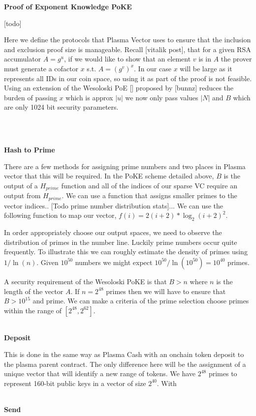 \documentclass[11pt]{article}
\begin{document}
\centerline{\textbf{Proof of Exponent Knowledge \textbf{PoKE}}}

[todo]

Here we define the protocols that Plasma Vector uses to ensure that the inclusion and exclusion proof size is manageable. Recall [vitalik post], that for a given RSA accumulator $A = g^u$, if we would like to show that an element $v$ is in $A$ the prover must generate a cofactor $x$ s.t. $A = (g^v)^x$. In our case $x$ will be large as it represents all IDs in our coin space, so using it as part of the proof is not feasible. Using an extension of the Wesoloski PoE [] proposed by [bunnz] reduces the burden of passing $x$ which is approx $|u|$ we now only pass values $|N|$ and $B$ which are only 1024 bit security parameters.



\\ 
\\
\centerline{\textbf{Hash to Prime}}

There are a few methods for assigning prime numbers and two places in Plasma vector that this will be required. In the PoKE scheme detailed above, $B$ is the output of a $H_{prime}$ function and all of the indices of our sparse VC require an output from $H_{prime}$. We can use a function that assigns smaller primes to the vector indices.. [Todo prime number distribution stats]... We can use the following function to map our vector, $f(i)=2(i+2)* \log_2(i+2)^2$.

In order appropriately choose our output spaces, we need to observe the distribution of primes in the number line. Luckily prime numbers occur quite frequently. To illustrate this we can roughly estimate the density of primes using $1/\ln(n)$. Given $10^{50}$ numbers we might expect $10^{50}/\ln(10^{50})=10^{40} $ primes.

A security requirement of the Wesoloski PoKE is that $B > n$ where $n$ is the length of the vector $A$. If $n=2^{48}$ primes then we will have to ensure that $B > 10^{15}$ and prime. We can make a criteria of the prime selection choose primes within the range of $[2^{48}, 2^{62}]$.
\\
\\
\centerline{\textbf{Deposit}}

This is done in the same way as Plasma Cash with an onchain token deposit to the plasma parent contract. The only difference here will be the assignment of a unique vector that will identify a new range of tokens. We have $2^{48}$ primes to represent 160-bit public keys in a vector of size $2^{40}$. With 
\\
\\
\centerline{\textbf{Send}}
\end{document}
